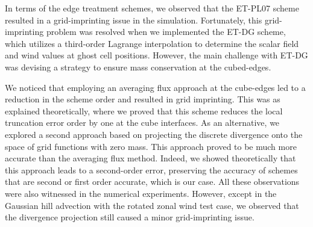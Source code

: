 In terms of the edge treatment schemes, we observed that the ET-PL07 scheme resulted in a 
grid-imprinting issue in the simulation. Fortunately, this grid-imprinting problem was 
resolved when we implemented the ET-DG scheme, which utilizes a third-order Lagrange 
interpolation to determine the scalar field and wind values at ghost cell positions. 
However, the main challenge with ET-DG was devising a strategy to ensure mass 
conservation at the cubed-edges.

We noticed that employing an averaging flux approach at the cube-edges led to a reduction 
in the scheme order and resulted in grid imprinting. This was as explained theoretically, where
we proved that this scheme reduces the local truncation error order by one at the cube interfaces.
As an alternative, we explored a second approach based on projecting the discrete divergence onto the space of grid 
functions with zero mass. This approach proved to be much more accurate than the averaging 
flux method.  Indeed, we showed theoretically that this approach leads to a second-order error, preserving the
accuracy of schemes that are second or first order accurate, which is our case.
All these observations were also witnessed in the numerical experiments.
However, except in the Gaussian hill advection with the rotated zonal wind test case,
we observed that the divergence projection still caused a minor grid-imprinting issue.
\iffalse
\fi